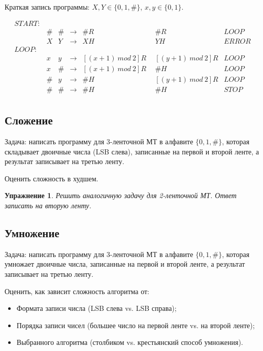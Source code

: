 \documentclass[a4paper, 12pt]{extarticle}
\newtheorem*{homework}{Упражнение}
\newcommand{\MTRuleTwo}[7]{#1 & #2 & \rightarrow & #3#4\ &\ #5#6 & #7}
\begin{document}
Краткая запись программы: $X, Y \in \{0, 1, \#\}$, $x, y \in \{0, 1\}$.

\begin{align*}
START: &          & & & &                              \\
       & \MTRuleTwo{\#}{\#}{\#}{R}{\#}{R}{LOOP} \\
       & \MTRuleTwo{X}{Y}{X}{H}{Y}{H}{ERROR}    \\
LOOP:  &          & & & &                              \\
       & \MTRuleTwo{x}{y}{[(x+1)\ mod\ 2]}{R}{[(y + 1)\ mod\ 2]}{R}{LOOP}    \\
       & \MTRuleTwo{x}{\#}{[(x+1)\ mod\ 2]}{R}{\#}{H}{LOOP}    \\
       & \MTRuleTwo{\#}{y}{\#}{H}{[(y + 1)\ mod\ 2]}{R}{LOOP}    \\
       & \MTRuleTwo{\#}{\#}{\#}{H}{\#}{H}{STOP}    \\       
\end{align*}

\subsection*{Сложение}
Задача: написать программу для 3-ленточной МТ в алфавите $\{0, 1, \#\}$, которая 
складывает двоичные числа (LSB слева), записанные на первой и второй ленте, а результат записывает на третью ленту.

Оценить сложность в худшем.

\begin{homework}
Решить аналогичную задачу для 2-ленточной МТ. Ответ записать на вторую ленту.
\end{homework}

\subsection*{Умножение}

Задача: написать программу для 3-ленточной МТ в алфавите $\{0, 1, \#\}$, которая 
умножает двоичные числа, записанные на первой и второй ленте, а результат записывает на третью ленту.

Оценить, как зависит сложность алгоритма от:
\begin{itemize}
 \item Формата записи числа (LSB слева vs. LSB справа);
 \item Порядка записи чисел (большее число на первой ленте vs. на второй ленте);
 \item Выбранного алгоритма (столбиком vs. крестьянский способ умножения).
\end{itemize}
\end{document}
